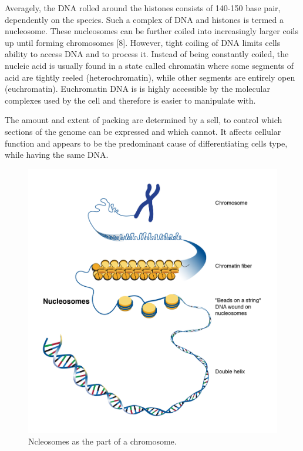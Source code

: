 Averagely, the DNA rolled around the histones consists of 140-150 base pair, dependently on the species. Such a complex of DNA and histones is termed a nucleosome. These nucleosomes can be further coiled into increasingly larger coils up until forming chromosomes [8]. However, tight coiling of DNA limits cells ability to access DNA and to process it. Instead of being constantly coiled, the nucleic acid is usually found in a state called chromatin where some segments of acid are tightly reeled (heterochromatin), while other segments are entirely open (euchromatin). Euchromatin DNA is is highly accessible by the molecular complexes used by the cell and therefore is easier to manipulate with. 

The amount and extent of packing are determined by a sell, to control which sections of the genome can be expressed and which cannot. It affects cellular function and appears to be the predominant cause of differentiating cells type, while having the same DNA.

\begin{figure}[!ht]
	\centering
	\includegraphics[width=.9\textwidth]{figures/nucleosome1}
	\caption{Ncleosomes as the part of a chromosome.\label{o:latex_friendly_zone}}
\end{figure}